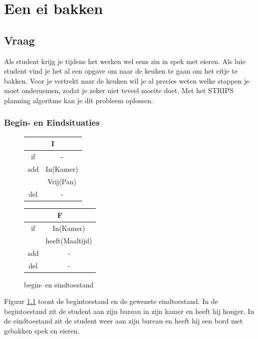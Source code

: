 \documentclass[alternative-exam.tex]{subfiles}
\begin{document}
\chapter{Een ei bakken}
\section{Vraag}
Als student krijg je tijdens het werken wel eens zin in spek met eieren. Als luie student vind je het al een opgave om naar de keuken te gaan om het eitje te bakken. Voor je vertrekt naar de keuken wil je al precies weten welke stappen je moet ondernemen, zodat je zeker niet teveel moeite doet. Met het STRIPS planning algoritme kan je dit probleem oplossen.

\subsection{Begin- en Eindsituaties}
\begin{figure}[H]
\centering
\begin{tabular}{|c|c|}
    \multicolumn{2}{c}{I}\\
    \hline
    if & -\\
    \hline
    add & In(Kamer)\\
        & Vrij(Pan)\\
    \hline
    del & -\\
    \hline
\end{tabular}
\hspace{0.25 cm}
\begin{tabular}{|c|c|}
    \multicolumn{2}{c}{F}\\
    \hline
    if & In(Kamer)\\
    & heeft(Maaltijd)\\
    \hline
    add & -\\
    \hline
    del & -\\
    \hline
\end{tabular}
\caption{begin- en eindtoestand}
\label{ienf}
\end{figure}
Figuur \ref{ienf} toont de begintoestand en de gewenste eindtoestand. In de begintoestand zit de student aan zijn bureau in zijn kamer en heeft hij honger. In de eindtoestand zit de student weer aan zijn bureau en heeft hij een bord met gebakken spek en eieren.
\end{document}
